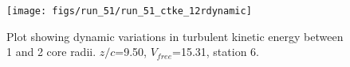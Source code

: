 \begin{figure}[H]
\centering
\texttt{[image: figs/run\_51/run\_51\_ctke\_12rdynamic]}
\caption{Plot showing dynamic variations in turbulent kinetic energy between 1 and 2 core radii. $z/c$=9.50, $V_{free}$=15.31, station 6.}
\label{fig:run_51_ctke_12rdynamic}
\end{figure}


